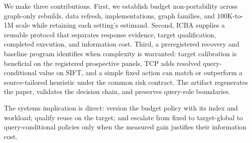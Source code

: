 We make three contributions. First, we establish budget non-portability across graph-only rebuilds, data refresh, implementations, graph families, and 100K-to-1M scale while retaining each setting's estimand. Second, ICBA supplies a reusable protocol that separates response evidence, target qualification, completed execution, and information cost. Third, a preregistered recovery and baseline program identifies when complexity is warranted: target calibration is beneficial on the registered prospective panels, TCP adds resolved query-conditional value on SIFT, and a simple fixed action can match or outperform a source-tailored heuristic under the common risk contract. The artifact regenerates the paper, validates the decision chain, and preserves query-role boundaries.

The systems implication is direct: version the budget policy with its index and workload; qualify reuse on the target; and escalate from fixed to target-global to query-conditional policies only when the measured gain justifies their information cost.
